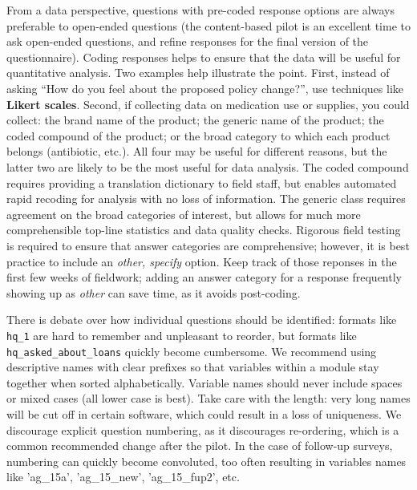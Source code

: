 From a data perspective, questions with pre-coded response options are always preferable to open-ended questions (the content-based pilot is an excellent time to ask open-ended questions, and refine responses for the final version of the questionnaire). Coding responses helps to ensure that the data will be useful for quantitative analysis. Two examples help illustrate the point. First, instead of asking ``How do you feel about the proposed policy change?'', use techniques like
\textbf{Likert scales}. Second, if collecting data on medication use or supplies, you could collect: the brand name of the product; the generic name of the product; the coded compound of the product; or the broad category to which each product belongs (antibiotic, etc.). All four may be useful for different reasons, but the latter two are likely to be the most useful for data analysis. The coded compound requires providing a translation dictionary to field staff, but enables automated rapid recoding for analysis with no loss of information. The generic class requires agreement on the broad categories of interest, but allows for much more comprehensible top-line statistics and data quality checks. Rigorous field testing is required to ensure that answer categories are comprehensive; however, it is best practice to include an \textit{other, specify} option. Keep track of those reponses in the first few weeks of fieldwork; adding an answer category for a response frequently showing up as \textit{other} can save time, as it avoids post-coding. 

There is debate over how individual questions should be identified: formats like \texttt{hq\_1} are hard to remember and unpleasant to reorder, but formats like \texttt{hq\_asked\_about\_loans} quickly become cumbersome.
We recommend using descriptive names with clear prefixes so that variables 
within a module stay together when sorted 
alphabetically.
 Variable names should never include spaces or mixed cases (all lower case is 
best). Take care with the length: very long names will be cut off in certain 
software, which could result in a loss of uniqueness. We discourage explicit 
question numbering, as it discourages re-ordering, which is a common 
recommended change after the pilot. In the case of follow-up surveys, numbering 
can quickly become convoluted, too often resulting in variables names like 
'ag\_15a', 'ag\_15\_new', 'ag\_15\_fup2', etc.

